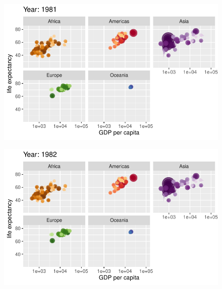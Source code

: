 \documentclass[
  letterpaper,
  DIV=11,
  numbers=noendperiod]{scrartcl}
\begin{document}
\begin{figure}[H]

{\centering \includegraphics{class05_files/figure-pdf/unnamed-chunk-24-54.pdf}

}

\end{figure}

\begin{figure}[H]

{\centering \includegraphics{class05_files/figure-pdf/unnamed-chunk-24-55.pdf}

}

\end{figure}
\end{document}
